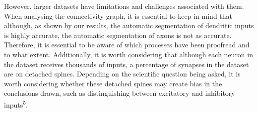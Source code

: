 \documentclass{article}
\begin{document}
However, larger datasets have limitations and challenges associated with them. When analysing the connectivity graph, it is essential to keep in mind that although, as shown by our results, the automatic segmentation of dendritic inputs is highly accurate, the automatic segmentation of axons is not as accurate. Therefore, it is essential to be aware of which processes have been proofread and to what extent. Additionally, it is worth considering that although each neuron in the dataset receives thousands of inputs, a percentage of synapses in the dataset are on detached spines. Depending on the scientific question being asked, it is worth considering whether these detached spines may create bias in the conclusions drawn, such as distinguishing between excitatory and inhibitory inputs\textsuperscript{5}.
\end{document}

